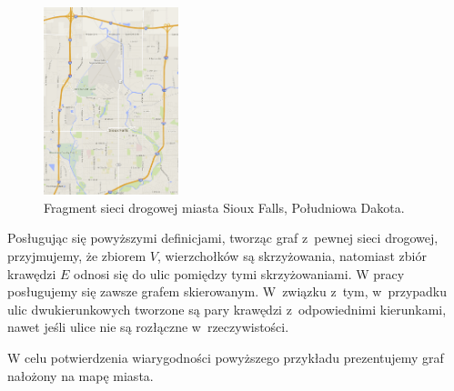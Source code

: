\documentclass[twoside,12pt]{report}
\begin{document}
\begin{figure}[ht]
\begin{center}
\includegraphics[width=0.35\textwidth]{img/siec}
\caption{Fragment sieci drogowej miasta Sioux Falls, Południowa Dakota.} 
\end{center}
\end{figure}

Posługując się powyższymi definicjami, tworząc graf z~pewnej sieci drogowej, przyjmujemy, że zbiorem $V$, wierzchołków są skrzyżowania, natomiast zbiór krawędzi $E$ odnosi się do ulic pomiędzy tymi skrzyżowaniami.
W pracy posługujemy się zawsze grafem skierowanym. W~związku z~tym, w~przypadku ulic dwukierunkowych tworzone są pary krawędzi z~odpowiednimi kierunkami, nawet jeśli ulice nie są rozłączne w~rzeczywistości.

W celu potwierdzenia wiarygodności powyższego przykładu prezentujemy graf nałożony na mapę miasta\cite{siux}.
\end{document}

